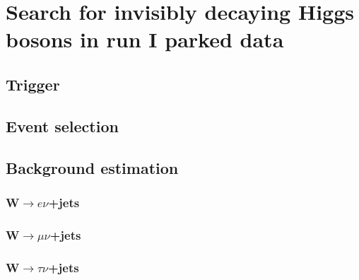 \chapter{Search for invisibly decaying Higgs bosons in run I parked data}
\label{chap:parked}


\section{Trigger}%
\label{sec:parkedtrigger}

\section{Event selection}%
\label{sec:parkedsel}

\section{Background estimation}%
\label{sec:parkedbkg}

\subsection{W$\rightarrow e\nu$+jets}%
\label{sec:parkedwenu}

\subsection{W$\rightarrow \mu\nu$+jets}%
\label{sec:parkedwmunu}

\subsection{W$\rightarrow \tau\nu$+jets}%
\label{sec:parkedwtaunu}

